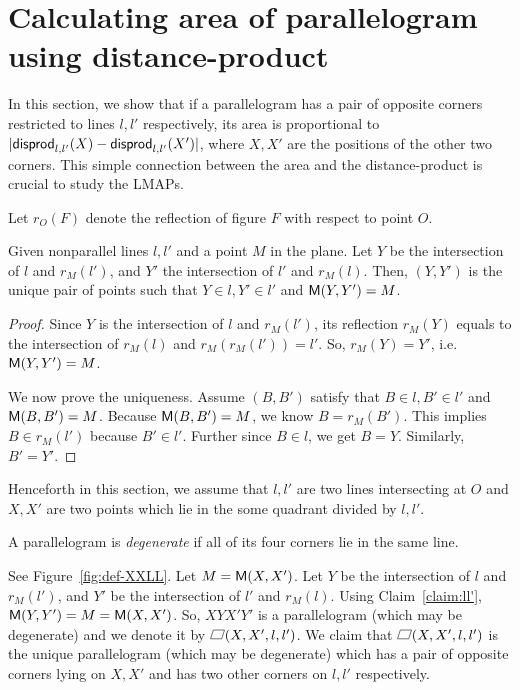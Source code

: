 \documentclass{ws-ijcga}
\begin{document}
\section{Calculating area of parallelogram using distance-product}\label{sect:identity}

In this section, we show that if a parallelogram has a pair of opposite corners restricted to lines $l,l'$ respectively,
  its area is proportional to $|\mathsf{disprod}_{l,l'}(X)-\mathsf{disprod}_{l,l'}(X')|$, where $X,X'$ are the positions of the other two corners.
  This simple connection between the area and the distance-product is crucial to study the LMAPs.

Let $r_O(F)$ denote the reflection of figure $F$ with respect to point $O$.
\begin{claim}\label{claim:ll'}
Given nonparallel lines $l,l'$ and a point $M$ in the plane.
Let $Y$ be the intersection of $l$ and $r_M(l')$, and $Y'$ the intersection of $l'$ and $r_M(l)$.
Then, $(Y,Y')$ is the unique pair of points such that $Y\in l,Y'\in l'$ and $\mathsf{M}(Y,Y')=M$.
\end{claim}

\begin{proof}
Since $Y$ is the intersection of $l$ and $r_M(l')$,
  its reflection $r_M(Y)$ equals to the intersection of $r_M(l)$ and $r_M(r_M(l'))=l'$.
  So, $r_M(Y)=Y'$, i.e.\ $\mathsf{M}(Y,Y')=M$.

We now prove the uniqueness. Assume $(B,B')$ satisfy that $B\in l,B'\in l'$ and $\mathsf{M}(B,B')=M$.
    Because $\mathsf{M}(B,B')=M$, we know $B=r_M(B')$. This implies $B\in r_M(l')$ because $B'\in l'$.
    Further since $B\in l$, we get $B=Y$. Similarly, $B'=Y'$.
 \end{proof}

\newcommand\parallelogram{\mathord{\text{\tikz[baseline] \draw (0,.1ex) -- (.8em,.1ex) -- (1em,1.6ex) -- (.2em,1.6ex) -- cycle;}}}

Henceforth in this section, we assume that $l,l'$ are two lines intersecting at $O$ and $X,X'$ are two points which lie in the some quadrant divided by $l,l'$.

A parallelogram is \emph{degenerate} if all of its four corners lie in the same line.

\begin{claim}\label{claim:XX'll'}
See Figure~\ref{fig:def-XXLL}. Let $M=\mathsf{M}(X,X')$.
Let $Y$ be the intersection of $l$ and $r_M(l')$, and $Y'$ be the intersection of $l'$ and $r_M(l)$.
Using Claim~\ref{claim:ll'}, $\mathsf{M}(Y,Y')=M=\mathsf{M}(X,X')$. So, $XYX'Y'$ is a parallelogram (which may be degenerate)
and we denote it by $\parallelogram(X,X',l,l')$.
We claim that $\parallelogram(X,X',l,l')$ is the unique parallelogram (which may be degenerate) which has a pair of opposite corners lying on $X,X'$ and has two other corners on $l,l'$ respectively.
\end{claim}
\end{document}
